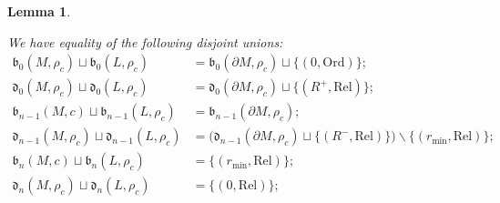 \documentclass[a4paper,11pt]{article}
\newtheorem{lemma}[theorem]{Lemma}
\theoremstyle{definition}
\begin{document}
\begin{lemma}\label{lem:births0}

We have equality of the following disjoint unions:
\begin{align*}
\mathfrak{b}_0(M,\rho_c)\sqcup  \mathfrak{b}_0(L,\rho_c)&= \mathfrak{b}_0(\partial M,\rho_c)\sqcup \{(0,\text{Ord})\};\\
\mathfrak{d}_0(M,\rho_c)\sqcup  \mathfrak{d}_0(L,\rho_c) &= \mathfrak{d}_0(\partial M,\rho_c)\sqcup \{(R^+,\text{Rel})\};\\
\mathfrak{b}_{n-1}(M,c)\sqcup  \mathfrak{b}_{n-1}(L,\rho_c)&= \mathfrak{b}_{n-1}(\partial M,\rho_c);\\
\mathfrak{d}_{n-1}(M,\rho_c)\sqcup  \mathfrak{d}_{n-1}(L,\rho_c)&= \big(\mathfrak{d}_{n-1}(\partial M,\rho_c)\sqcup \{(R^-,\text{Rel})\} \big)\backslash \{(r_{\min},\text{Rel})\};\\
\mathfrak{b}_n(M,c)\sqcup  \mathfrak{b}_n(L,\rho_c)&=\{(r_{\min},\text{Rel})\} ;\\
\mathfrak{d}_n(M,\rho_c)\sqcup  \mathfrak{d}_n(L,\rho_c) &= \{(0,\text{Rel})\};
\end{align*}

\end{lemma}
\end{document}
